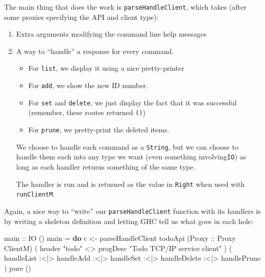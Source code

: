 \documentclass[]{article}
\newenvironment{Shaded}{}{}
\newcommand{\DataTypeTok}[1]{\textcolor[rgb]{0.56,0.13,0.00}{#1}}
\newcommand{\FunctionTok}[1]{\textcolor[rgb]{0.02,0.16,0.49}{#1}}
\newcommand{\KeywordTok}[1]{\textcolor[rgb]{0.00,0.44,0.13}{\textbf{#1}}}
\newcommand{\NormalTok}[1]{#1}
\newcommand{\OperatorTok}[1]{\textcolor[rgb]{0.40,0.40,0.40}{#1}}
\newcommand{\OtherTok}[1]{\textcolor[rgb]{0.00,0.44,0.13}{#1}}
\newcommand{\StringTok}[1]{\textcolor[rgb]{0.25,0.44,0.63}{#1}}
\begin{document}
The main thing that does the work is \texttt{parseHandleClient}, which takes
(after some proxies specifying the API and client type):

\begin{enumerate}
\def\labelenumi{\arabic{enumi}.}
\item
  Extra arguments modifying the command line help messages
\item
  A way to ``handle'' a response for every command.

  \begin{itemize}
  \tightlist
  \item
    For \texttt{list}, we display it using a nice pretty-printer
  \item
    For \texttt{add}, we show the new ID number.
  \item
    For \texttt{set} and \texttt{delete}, we just display the fact that it was
    successful (remember, these routes returned \texttt{()})
  \item
    For \texttt{prune}, we pretty-print the deleted items.
  \end{itemize}

  We choose to handle each command as a \texttt{String}, but we can choose to
  handle them each into any type we want (even something involving\texttt{IO})
  as long as each handler returns something of the same type.

  The handler is run and is returned as the value in \texttt{Right} when used
  with \texttt{runClientM}.
\end{enumerate}

Again, a nice way to ``write'' our \texttt{parseHandleClient} function with its
handlers is by writing a skeleton definition and letting GHC tell us what goes
in each hole:

\begin{Shaded}
\begin{Highlighting}[]
\OtherTok{main ::} \DataTypeTok{IO}\NormalTok{ ()}
\NormalTok{main }\OtherTok{=} \KeywordTok{do}
\NormalTok{    c }\OtherTok{\textless{}{-}}\NormalTok{ parseHandleClient todoApi (}\DataTypeTok{Proxy}\OtherTok{ ::} \DataTypeTok{Proxy} \DataTypeTok{ClientM}\NormalTok{)}
\NormalTok{        ( header }\StringTok{"todo"} \OperatorTok{\textless{}\textgreater{}}\NormalTok{ progDesc }\StringTok{"Todo TCP/IP service client"}\NormalTok{ )}
\NormalTok{        ( handleList}
     \OperatorTok{:\textless{}|\textgreater{}}\NormalTok{ handleAdd}
     \OperatorTok{:\textless{}|\textgreater{}}\NormalTok{ handleSet}
     \OperatorTok{:\textless{}|\textgreater{}}\NormalTok{ handleDelete}
     \OperatorTok{:\textless{}|\textgreater{}}\NormalTok{ handlePrune}
\NormalTok{        )}
    \FunctionTok{pure}\NormalTok{ ()}
\end{Highlighting}
\end{Shaded}
\end{document}

